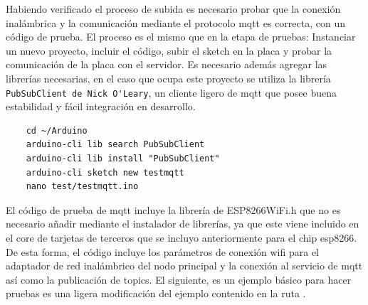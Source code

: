 \vspace{1cm}


Habiendo verificado el proceso de subida es necesario probar que la conexión inalámbrica y la comunicación mediante el protocolo \gls{mqtt} es correcta, con un código de prueba. El proceso es el mismo que en la etapa de pruebas: Instanciar un nuevo proyecto, incluir el código, subir el \gls{sketch} en la placa y probar la comunicación de la placa con el servidor. Es necesario además agregar las librerías necesarias, en el caso que ocupa este proyecto se utiliza la librería \verb|PubSubClient de Nick O'Leary|, un cliente ligero de \gls{mqtt} que posee buena estabilidad y fácil integración en desarrollo.

\begin{verbatim}
    cd ~/Arduino
    arduino-cli lib search PubSubClient
    arduino-cli lib install "PubSubClient"
    arduino-cli sketch new testmqtt
    nano test/testmqtt.ino
\end{verbatim}

El código de prueba de \gls{mqtt} incluye la librería de ESP8266WiFi.h que no es necesario añadir mediante el instalador de librerías, ya que este viene incluido en el core de tarjetas de terceros que se incluyo anteriormente para el chip esp8266. De esta forma, el código incluye los parámetros de conexión \gls{wifi} para el adaptador de red inalámbrico del nodo principal y la conexión al servicio de \gls{mqtt} así como la publicación de topics. El siguiente, es un ejemplo básico para hacer pruebas es una ligera modificación del ejemplo contenido en la ruta .


